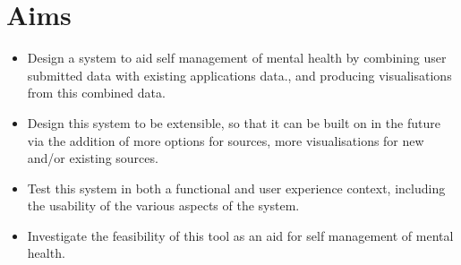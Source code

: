 \documentclass[11pt,openright,a4paper]{report}
\begin{document}
\section{Aims} \label{aims}
\begin{itemize}
\item Design a system to aid self management of mental health by combining user submitted data with existing applications data., and producing visualisations from this combined data.
\item Design this system to be extensible, so that it can be built on in the future via the addition of more options for sources, more visualisations for new and/or existing sources.
\item Test this system in both a functional and user experience context, including the usability of the various aspects of the system.
\item Investigate the feasibility of this tool as an aid for self management of mental health.
\end{itemize}
\end{document}
